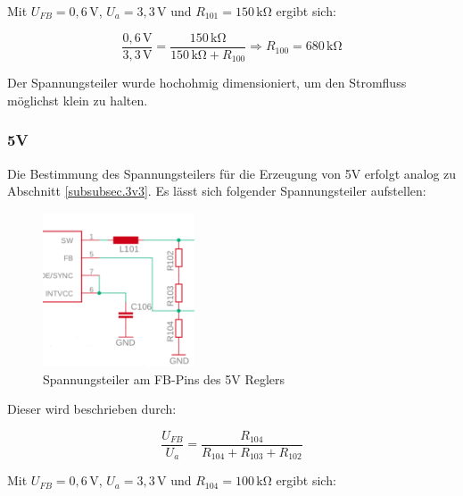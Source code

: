Mit $U_{FB}=0,6\,\si{\volt}$, $U_a=3,3\,\si{\volt}$ und $R_{101}=150\,\si{\kilo\ohm}$ ergibt sich:

\begin{minipage}{\textwidth}
\begin{equation}\label{eq:Spannungsteiler3v3b}
\frac {0,6\,\si{\volt}}{3,3\,\si{\volt}}{=}  \frac{150\,\si{\kilo\ohm}}{150\,\si{\kilo\ohm}+R_{100}} \Rightarrow R_{100}=680\,\si{\kilo\ohm}
\end{equation}
\end{minipage}

Der Spannungsteiler wurde hochohmig dimensioniert, um den Stromfluss möglichst klein zu halten.


\subsubsection{5V}\label{subsubsec.5v}
Die Bestimmung des Spannungsteilers für die Erzeugung von 5V erfolgt analog zu Abschnitt \ref{subsubsec.3v3}. Es lässt sich folgender Spannungsteiler aufstellen:

\begin{figure}[H]
  \centering
  \includegraphics[width=0.4\textwidth]{./img/spannungsteiler_5v.png}
  \caption{Spannungsteiler am FB-Pins des 5V Reglers}\label{fig.spgsteiler5v}
\end{figure}

Dieser wird beschrieben durch:

\begin{minipage}{\textwidth}
\begin{equation}\label{eq:Spannungsteiler5v}
\frac {U_{FB}}{U_a}{=}  \frac{R_{104}}{R_{104}+R_{103}+R_{102}}
\end{equation}
\end{minipage}

Mit $U_{FB}=0,6\,\si{\volt}$, $U_a=3,3\,\si{\volt}$ und $R_{104}=100\,\si{\kilo\ohm}$ ergibt sich:

